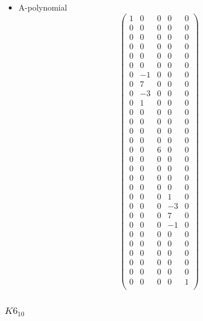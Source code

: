\documentclass[12pt,reqno]{amsart}
\numberwithin{equation}{section}
\begin{document}
\begin{itemize}
\item A-polynomial
  \begin{equation*}
    \begin{pmatrix}
      1 & 0  & 0 & 0 & 0 \\
      0 & 0 & 0 & 0 & 0 \\
      0 & 0 & 0 & 0 & 0 \\
      0 & 0 & 0 & 0 & 0 \\
      0 & 0 & 0 & 0 & 0 \\
      0 & 0 & 0 & 0 & 0 \\
      0 & -1 & 0 & 0 & 0 \\
      0 & 7 & 0 & 0 & 0 \\
      0 & -3 & 0 & 0 & 0 \\
      0 & 1 & 0 & 0 & 0 \\
      0 & 0 & 0 & 0 & 0 \\
      0 & 0 & 0 & 0 & 0 \\
      0 & 0 & 0 & 0 & 0 \\
      0 & 0 & 0 & 0 & 0 \\
      0 & 0 & 6 & 0 & 0 \\
      0 & 0 & 0 & 0 & 0 \\
      0 & 0 & 0 & 0 & 0 \\
      0 & 0 & 0 & 0 & 0 \\
      0 & 0 & 0 & 0 & 0 \\
      0 & 0 & 0 & 1 & 0 \\
      0 & 0 & 0 & -3 & 0 \\
      0 & 0 & 0 & 7 & 0 \\
      0 & 0 & 0 & -1 & 0 \\
      0 & 0 & 0 & 0 & 0 \\
      0 & 0 & 0 & 0 & 0 \\
      0 & 0 & 0 & 0 & 0 \\
      0 & 0 & 0 & 0 & 0 \\
      0 & 0 & 0 & 0 & 0 \\
      0 & 0 & 0 & 0 & 1 \\
    \end{pmatrix}
  \end{equation*}
\end{itemize}

\subsubsection{%
  $K6_{10}$}
\end{document}
